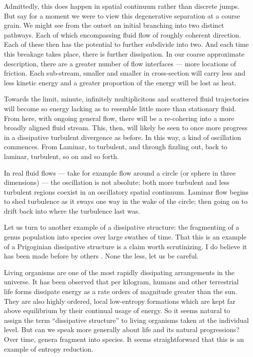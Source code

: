Admittedly, this does happen in spatial continuum rather than discrete jumps. But say for a moment we were to view this degenerative separation at a course grain. We might see from the outset an initial branching into two distinct pathways. Each of which encompassing fluid flow of roughly coherent direction. Each of these then has the potential to further subdivide into two. And each time this breakage takes place, there is further dissipation. In our coarse approximate description, there are a greater number of flow interfaces --- more locations of friction. Each sub-stream, smaller and smaller in cross-section will carry less and less kinetic energy and a greater proportion of the energy will be lost as heat.\par 
Towards the limit, minute, infinitely multiplicitous and scattered fluid trajectories will become so energy lacking as to resemble little more than stationary fluid. 
From here, with ongoing general flow, there will be a re-cohering into a more broadly aligned fluid stream. This, then, will likely be seen to once more progress in a dissipative turbulent divergence as before. In this way, a kind of oscillation commences. From Laminar, to turbulent, and through fizzling out, back to laminar, turbulent, so on and so forth. 

In real fluid flows --- take for example flow around a circle (or sphere in three dimensions) --- the oscillation is not absolute; both more turbulent and less turbulent regions coexist in an oscillatory spatial continuum. Laminar flow begins to shed turbulence as it sways one way in the wake of the circle; then going on to drift back into where the turbulence last was.\par 


Let us turn to another example of a dissipative structure: the fragmenting of a genus population into species over large swathes of time. That this is an example of a Prigoginian dissipative structure is a claim worth scrutinizing. I do believe it has been made before by others \cite{elitzur1994let} \cite{sharma2023assembly}.  None the less, let us be careful. 

Living organisms are one of the most rapidly dissipating arrangements in the universe. It has been observed that per kilogram, humans and other terrestrial life forms dissipate energy as a rate orders of magnitude greater than the sun. They are also highly ordered, local low-entropy formations which are kept far above equilibrium by their continual usage of energy. So it seems natural to assign the term ``dissipative structure'' to living organisms taken at the individual level. 
But can we speak more generally about life and its natural progressions? Over time, genera fragment into species. It seems straightforward that this is an example of entropy reduction.  



